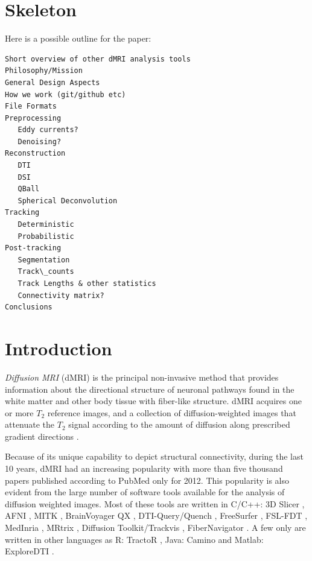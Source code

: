 \documentclass{bioinfo}
\begin{document}
\section{Skeleton}
Here is a possible outline for the paper:
\begin{verbatim}
Short overview of other dMRI analysis tools
Philosophy/Mission
General Design Aspects
How we work (git/github etc)
File Formats 
Preprocessing
   Eddy currents?
   Denoising?
Reconstruction
   DTI 
   DSI
   QBall
   Spherical Deconvolution 
Tracking
   Deterministic
   Probabilistic
Post-tracking
   Segmentation
   Track\_counts
   Track Lengths & other statistics
   Connectivity matrix?
Conclusions
\end{verbatim}

\section{Introduction}

\emph{Diffusion MRI} (dMRI) \citep{stejskal-tanner:65, lebihan-breton:85,merboldt-hanicke-etal:85, taylor-bushell:85, callaghan:91} is the principal non-invasive method that provides information about the directional structure of neuronal pathways found in the white matter and other body tissue with fiber-like structure. dMRI acquires one or 
more $T_{2}$ reference images, and a collection of diffusion-weighted images that attenuate the $T_{2}$ signal according to the amount of diffusion along prescribed gradient directions \citep{behrens-johansen-berg:09, jones:10}.

Because of its unique capability to depict structural connectivity, during the last 10 years, dMRI had an increasing popularity with more than five thousand papers published according to PubMed only for 2012. This popularity is also evident from the large number of software tools available for the analysis of diffusion weighted images. Most of these tools are written in C/C++: 3D Slicer \citep{pieper:06}, AFNI \citep{cox-afni:12}, MITK \citep{fritzsche-mitk:12}, BrainVoyager QX \citep{goebel-brainvoyager:12}, DTI-Query/Quench \citep{sherbondy:05}, FreeSurfer \citep{fischl-freesurfer:12}, FSL-FDT \citep{smith-fdt:04}, MedInria \citep{toussaint-souplet-etal:07}, MRtrix \citep{Tournier2012}, Diffusion Toolkit/Trackvis \citep{wang-diffusion-toolkit:07}, FiberNavigator \citep{vaillancourt:11, chamberland:13}. A few only are written in other languages as R: TractoR \citep{ clayden-TractoR:11}, Java: Camino \citep{Cook2006} and Matlab: ExploreDTI \citep{leemans-exploredti:09}. 
\end{document}
